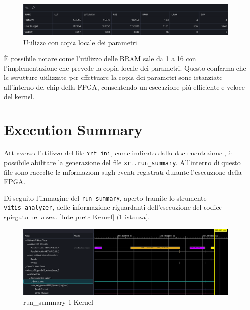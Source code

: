 \begin{figure}[h!]
\centering
\includegraphics[scale=0.40]{images/Capitolo5/8_im.png}
\caption{Utilizzo con copia locale dei parametri}
\label{pragma}
\end{figure}

È possibile notare come l'utilizzo delle BRAM sale da 1 a 16 con l'implementazione che prevede la copia locale dei parametri. Questo conferma  che le strutture utilizzate per effettuare la copia dei parametri sono istanziate all'interno del chip della FPGA, consentendo un esecuzione più efficiente e veloce del kernel.

\vspace{0.3cm}

\clearpage

\section{Execution Summary}
Attraverso l'utilizzo del file \texttt{xrt.ini}, come indicato dalla documentazione \cite{sitoDocumentazioneVitis}, è possibile abilitare la generazione del file \texttt{xrt.run\_summary}. All'interno di questo file sono raccolte le informazioni sugli eventi registrati durante l'esecuzione della FPGA.

\vspace{0.3cm}

\noindent Di seguito l'immagine del \texttt{run\_summary}, aperto tramite lo strumento \texttt{vitis\_analyzer}, delle informazione riguardanti dell'esecuzione del codice spiegato nella sez. \ref{Interprete Kernel} (1 istanza):

\begin{figure}[h!]
\centering
\includegraphics[scale=0.35]{images/Capitolo5/10_im.png}
\caption{run\_summary 1 Kernel}
\label{1curunsummary}
\end{figure}

